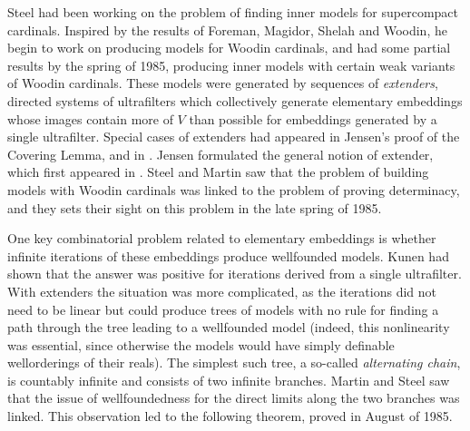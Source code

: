 \documentclass{book}%
\newcommand{\less}{\mathord{<}}
\begin{document}



Steel had been working on the problem of finding inner models for supercompact cardinals.
Inspired by the results of Foreman, Magidor, Shelah and Woodin,
he begin to work on producing models for Woodin cardinals, and had some partial results by the spring of
1985, producing inner models with certain weak variants of Woodin cardinals. These models were generated by sequences of
\emph{extenders}, directed systems of ultrafilters which collectively generate
elementary embeddings whose images contain more of $V$ than possible for
embeddings generated by a single ultrafilter. Special cases of extenders had appeared in Jensen's proof
of the Covering Lemma, and in \cite{Mitchell:1979}. Jensen formulated the general notion of extender, which first appeared
in \cite{Dodd:1982}.
Steel and Martin saw that the problem of building models with Woodin cardinals was linked to the problem of
proving determinacy, and they sets their sight on this problem in the late spring of 1985.

One key combinatorial problem related to elementary embeddings is
whether infinite iterations of these embeddings produce wellfounded
models. Kunen  had shown that the answer was positive for iterations
derived from a single ultrafilter. With extenders the situation was
more complicated, as the iterations did not need to be linear but
could produce trees of models with no rule for finding a path
through the tree leading to a wellfounded model (indeed, this nonlinearity was essential, since otherwise
the models would have simply definable wellorderings of their reals). The simplest such
tree, a so-called \emph{alternating chain}, is countably infinite and
consists of two infinite branches. Martin and Steel saw that the
issue of wellfoundedness for the direct limits along the two
branches was linked. This observation led to the following
theorem, proved in August of 1985.
\end{document}
